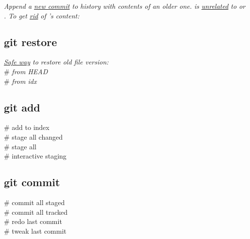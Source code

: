 \textit{Append a \href{https://stackoverflow.com/questions/19032296/how-to-use-git-revert}{new commit} to history with contents of an older one.  is \href{https://stackoverflow.com/questions/8358035/whats-the-difference-between-git-revert-checkout-and-reset}{unrelated} to  or . To get \ul{rid} of 's content:} \\

\subsection*{git restore}
\textit{\href{https://git-scm.com/book/en/v2/Git-Basics-Undoing-Things}{Safe way} to restore old file version:}\\
 \# \textit{from HEAD} \\
 \# \textit{from idx}

\subsection*{git add}
 \# add to index\\
 \# stage all changed\\
 \# stage all\\
 \# interactive staging

\subsection*{git commit}
 \# commit all staged \\
 \# commit all tracked \\
 \# redo last commit \\
 \# tweak last commit 

